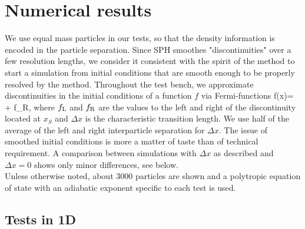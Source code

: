 \documentclass{elsart}
\begin{document}
\section{Numerical results}
\label{sec:setup}
We use equal mass particles in our tests, so that  the density information
is encoded in the particle separation. Since SPH smoothes "discontinuities" over a 
few resolution lengths, we consider it consistent with the spirit of the method
to start a simulation from initial conditions that are smooth enough to be properly
resolved by the method. Throughout the test bench, we approximate discontinuities in the initial 
conditions of a function $f$ via Fermi-functions
\be
f(x)=  + f_{\rm R},
\label{eq:fermi}
\ee
where $f_{\rm L}$ and $f_{\rm R}$ are the values to the left and right of the discontinuity 
located at $x_S$ and $\Delta x$ is the characteristic transition length. We use half of 
the average of the left and right interparticle separation for $\Delta x$. 
The issue of smoothed initial conditions is more a matter of taste than of technical
requirement. A comparison between simulations with $\Delta x$ as described and $\Delta x= 0$
shows only minor differences, see below.\\
Unless otherwise noted, about 3000 particles are shown and a polytropic equation of state 
with an adiabatic exponent specific to each test is used.

\subsection{Tests in 1D}
\end{document}
